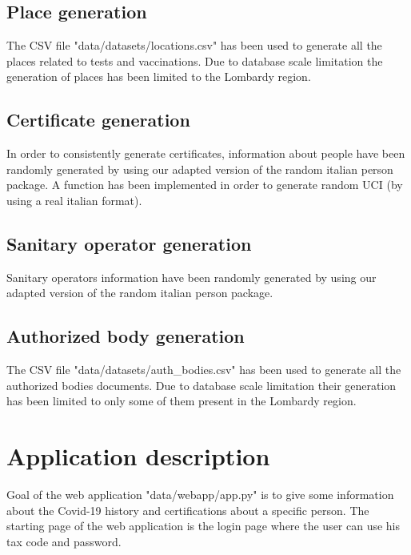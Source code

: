 \documentclass{article}
\begin{document}
\subsection{Place generation}
The CSV file {\selectfont"data/datasets/locations.csv"} has been used to generate all the places related to tests and vaccinations. Due to database scale limitation the generation of places has been limited to the Lombardy region.

\subsection{Certificate generation}
In order to consistently generate certificates, information about people have been randomly generated by using our adapted version of the random italian person package. A function has been implemented in order to generate random UCI (by using a real italian format).

\subsection{Sanitary operator generation}
Sanitary operators information have been randomly generated by using our adapted version of the random italian person package.

\subsection{Authorized body generation}
The CSV file {\selectfont"data/datasets/auth\_bodies.csv"} has been used to generate all the authorized bodies documents. Due to database scale limitation their generation has been limited to only some of them present in the Lombardy region.


\newpage
\section{Application description}
Goal of the web application {\selectfont"data/webapp/app.py"} is to give some information about the Covid-19 history and certifications about a specific person.
The starting page of the web application is the login page where the user can use his tax code
and password.
\end{document}
